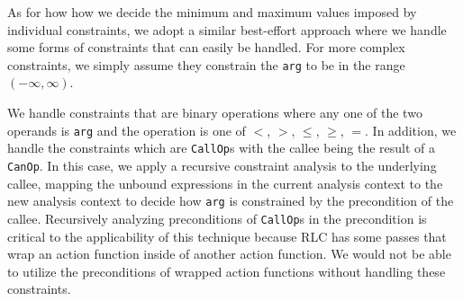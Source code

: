 As for how how we decide the minimum and maximum values imposed by individual constraints, we adopt a similar best-effort approach where we handle some forms of constraints that can easily be handled.
For more complex constraints, we simply assume they constrain the \texttt{arg} to be in the range $(-\infty, \infty)$.

We handle constraints that are binary operations where any one of the two operands is \texttt{arg} and the operation is one of $<$, $>$, $\le$, $\ge$, $=$.
In addition, we handle the constraints which are \texttt{CallOp}s with the callee being the result of a \texttt{CanOp}.
In this case, we apply a recursive constraint analysis to the underlying callee, mapping the unbound expressions in the current analysis context to the new analysis context to decide how \texttt{arg} is constrained by the precondition of the callee.
Recursively analyzing preconditions of \texttt{CallOp}s in the precondition is critical to the applicability of this technique because RLC has some passes that wrap an action function inside of another action function.
We would not be able to utilize the preconditions of wrapped action functions without handling these constraints.